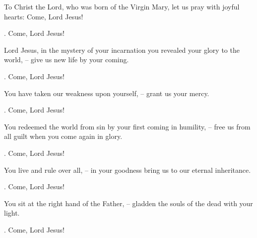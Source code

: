 \lettrine[loversize=0.15,lines=2]{T}{}o Christ the Lord, who was born of the Virgin Mary, let us pray with joyful hearts: Come, Lord Jesus!
\par \Rbar. Come, Lord Jesus!

Lord Jesus, in the mystery of your incarnation you revealed your glory to the world,
– give us new life by your coming.
\par \Rbar. Come, Lord Jesus!

You have taken our weakness upon yourself,
– grant us your mercy.
\par \Rbar. Come, Lord Jesus!

You redeemed the world from sin by your first coming in humility,
– free us from all guilt when you come again in glory.
\par \Rbar. Come, Lord Jesus!

You live and rule over all,
– in your goodness bring us to our eternal inheritance.
\par \Rbar. Come, Lord Jesus!

You sit at the right hand of the Father,
– gladden the souls of the dead with your light.
\par \Rbar. Come, Lord Jesus!
